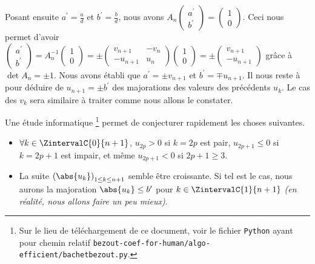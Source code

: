 Posant ensuite $a^\prime = \frac{a}{d}$ et  $b^\prime = \frac{b}{d}$, nous avons
$A_n
 \begin{pmatrix}
 	a^\prime  \\
	b^\prime
 \end{pmatrix}
 =
 \begin{pmatrix}
 	1 \\
	0	
 \end{pmatrix}$.
Ceci nous permet d'avoir
$\begin{pmatrix}
 	a^\prime  \\
	b^\prime
 \end{pmatrix}
 =
 A_n^{-1}
 \begin{pmatrix}
 	1 \\
	0	
 \end{pmatrix}
 =
 \pm
 \begin{pmatrix}
	 v_{n+1}  & -v_n     \\
	 -u_{n+1} & u_n	
 \end{pmatrix}
 \begin{pmatrix}
 	1 \\
	0	
 \end{pmatrix}
 =
 \pm
 \begin{pmatrix}
 	v_{n+1}  \\
	-u_{n+1}	
 \end{pmatrix}$
grâce à $\det A_n = \pm 1$.
Nous avons établi que $a^\prime = \pm v_{n+1}$ et $b^\prime = \mp u_{n+1}$. Il nous reste à  pour déduire de $u_{n+1} = \pm b^\prime$ des majorations des valeurs des précédents $u_k$. Le cas des $v_k$ sera similaire à traiter comme nous allons le constater.


\medskip


Une étude informatique
\footnote{
	Sur le lieu de téléchargement de ce document, voir le fichier \texttt{Python} ayant pour chemin relatif \texttt{bezout-coef-for-human/algo-efficient/bachetbezout.py}.
}
permet de conjecturer rapidement les choses suivantes.

\begin{itemize}[label = \small\textbullet]
	\item $\forall k \in \ZintervalC{0}{n+1}$, $u_{2p} > 0$ si $k = 2p$ est pair, $u_{2p+1} \leq 0$ si $k = 2p+1$ est impair, et même $u_{2p+1} < 0$ si $2p + 1 \geq 3$.


	\item La suite $\left( \abs{u_k} \right)_{1 \leq k \leq n+1}$ semble être croissante. Si tel est le cas, nous aurons la majoration $\abs{u_k} \leq b^\prime$ pour $k \in \ZintervalC{1}{n+1}$ \emph{(en réalité, nous allons faire un peu mieux)}.
\end{itemize}


